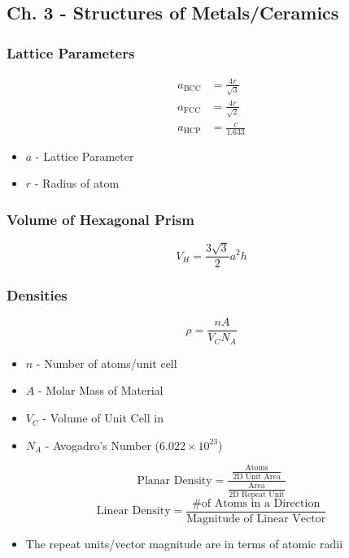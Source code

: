 	\subsection{Ch. 3 - Structures of Metals/Ceramics}
		\subsubsection{Lattice Parameters}
			\begin{align}
				a_{\text{BCC}} &= \frac{4r}{\sqrt{3}} \\
				a_{\text{FCC}} &= \frac{4r}{\sqrt{2}} \\
				a_{\text{HCP}} &= \frac{c}{1.633} 
			\end{align}
			\begin{itemize}[noitemsep]
				\item $a$ - Lattice Parameter
				\item $r$ - Radius of atom
			\end{itemize}

		\subsubsection{Volume of Hexagonal Prism}
			\begin{equation}
				V_{H} = \frac{3 \sqrt{3}}{2} a^{2} h
			\end{equation}

		\subsubsection{Densities}
			\begin{equation}
				\rho = \frac{nA}{V_{C} N_{A}}
			\end{equation}
			\begin{itemize}[noitemsep]
				\item $n$ - Number of atoms/unit cell
				\item $A$ - Molar Mass of Material
				\item $V_{C}$ - Volume of Unit Cell in \si{\centi \meter \cubic}
				\item $N_{A}$ - Avogadro's Number ($6.022 \times 10^{23}$)
			\end{itemize}

			\begin{equation}
				\text{Planar Density} = \frac{\frac{\text{Atoms}}{\text{2D Unit Area}}}{\frac{\text{Area}}{\text{2D Repeat Unit}}}
			\end{equation}
			\begin{equation}
				\text{Linear Density} = \frac{\text{\# of Atoms in a Direction}}{\text{Magnitude of Linear Vector}}
			\end{equation}
			\begin{itemize}[noitemsep]
				\item The repeat units/vector magnitude are in terms of atomic radii
			\end{itemize}


